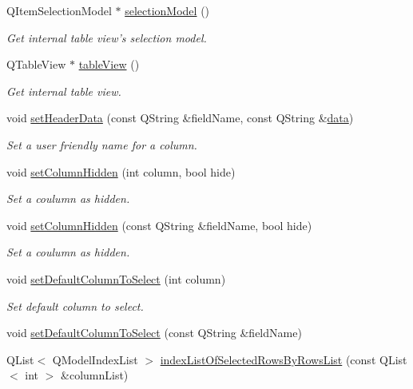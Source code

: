 \begin{DoxyCompactItemize}
Q\-Item\-Selection\-Model $\ast$ \hyperlink{classmdt_sql_table_widget_a47fc691f2cd9cc40749c987ce2bbea6d}{selection\-Model} ()
\begin{DoxyCompactList}\small\item\em Get internal table view's selection model. \end{DoxyCompactList}\item 
Q\-Table\-View $\ast$ \hyperlink{classmdt_sql_table_widget_af40eeb001ec262830daba6b311927ede}{table\-View} ()
\begin{DoxyCompactList}\small\item\em Get internal table view. \end{DoxyCompactList}\item 
void \hyperlink{classmdt_sql_table_widget_a591461ee19f22008a5c310609461081e}{set\-Header\-Data} (const Q\-String \&field\-Name, const Q\-String \&\hyperlink{classmdt_abstract_sql_widget_a3d362ebfc2d4f4b40b48ca08db287b3c}{data})
\begin{DoxyCompactList}\small\item\em Set a user friendly name for a column. \end{DoxyCompactList}\item 
void \hyperlink{classmdt_sql_table_widget_a466ff75bee2a0efd99c62994f65a5d18}{set\-Column\-Hidden} (int column, bool hide)
\begin{DoxyCompactList}\small\item\em Set a coulumn as hidden. \end{DoxyCompactList}\item 
void \hyperlink{classmdt_sql_table_widget_ae1eefd42d91ea36fa4244d7f265d7222}{set\-Column\-Hidden} (const Q\-String \&field\-Name, bool hide)
\begin{DoxyCompactList}\small\item\em Set a coulumn as hidden. \end{DoxyCompactList}\item 
void \hyperlink{classmdt_sql_table_widget_a3b3d79485206f7f3468e125e38bd24f9}{set\-Default\-Column\-To\-Select} (int column)
\begin{DoxyCompactList}\small\item\em Set default column to select. \end{DoxyCompactList}\item 
void \hyperlink{classmdt_sql_table_widget_a17d60fda061030fdfe15be5445eadc76}{set\-Default\-Column\-To\-Select} (const Q\-String \&field\-Name)
\item 
Q\-List$<$ Q\-Model\-Index\-List $>$ \hyperlink{classmdt_sql_table_widget_af28a5a54efb31c29734fb5b2d7f0e2fa}{index\-List\-Of\-Selected\-Rows\-By\-Rows\-List} (const Q\-List$<$ int $>$ \&column\-List)

\end{DoxyCompactItemize}
